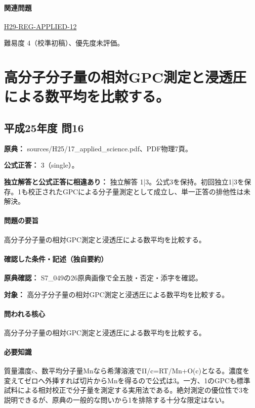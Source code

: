 \paragraph{関連問題} \hyperref[q:h29-reg-applied-12]{H29-REG-APPLIED-12}

\par 難易度 4（校準初稿）、優先度未評価。

\section{高分子分子量の相対GPC測定と浸透圧による数平均を比較する。}

\subsection{平成25年度 問16}
\label{q:h25-reg-applied-16}

\noindent\textbf{原典：} sources/H25/17\_applied\_science.pdf、PDF物理7頁。

\textbf{公式正答：} 3（single）。

\par\textbf{独立解答と公式正答に相違あり：} 独立解答 1|3。公式3を保持。初回独立1|3を保存。1も校正されたGPCによる分子量測定として成立し、単一正答の排他性は未解決。

\paragraph{問題の要旨} 高分子分子量の相対GPC測定と浸透圧による数平均を比較する。

\paragraph{確認した条件・記述（独自要約）}\mbox{}\par

\noindent\textbf{原典確認：} S7\_049の26原典画像で全五肢・否定・添字を確認。\par

\noindent\textbf{対象：} 高分子分子量の相対GPC測定と浸透圧による数平均を比較する。\par

\paragraph{問われる核心} 高分子分子量の相対GPC測定と浸透圧による数平均を比較する。

\paragraph{必要知識} 質量濃度c、数平均分子量Mnなら希薄溶液でΠ/c=\allowbreak{}RT/Mn+O(c)となる。濃度を変えてゼロへ外挿すれば切片からMnを得るので公式は3。一方、1のGPCも標準試料による相対校正で分子量を測定する実用法である。絶対測定の優位性で3を説明できるが、原典の一般的な問いから1を排除する十分な限定はない。

